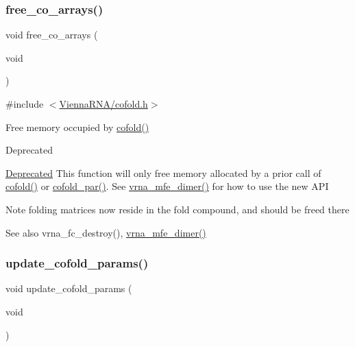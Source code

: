 \subsubsection{\texorpdfstring{free\+\_\+co\+\_\+arrays()}{free\_co\_arrays()}}
{\footnotesize\ttfamily void free\+\_\+co\+\_\+arrays (\begin{DoxyParamCaption}\item[{void}]{ }\end{DoxyParamCaption})}



{\ttfamily \#include $<$\hyperlink{cofold_8h}{Vienna\+R\+N\+A/cofold.\+h}$>$}



Free memory occupied by \hyperlink{group__mfe__cofold_gabc8517f22cfe70595ee81fc837910d52}{cofold()} 

\begin{DoxyRefDesc}{Deprecated}
\item[\hyperlink{deprecated__deprecated000032}{Deprecated}]This function will only free memory allocated by a prior call of \hyperlink{group__mfe__cofold_gabc8517f22cfe70595ee81fc837910d52}{cofold()} or \hyperlink{group__mfe__cofold_ga7612cfeeb1b793f1e4179b1eb53df1f3}{cofold\+\_\+par()}. See \hyperlink{group__mfe__cofold_gaab22d10c1190f205f16a77cab9d5d3ee}{vrna\+\_\+mfe\+\_\+dimer()} for how to use the new A\+PI\end{DoxyRefDesc}


\begin{DoxyNote}{Note}
folding matrices now reside in the fold compound, and should be free\textquotesingle{}d there 
\end{DoxyNote}
\begin{DoxySeeAlso}{See also}
vrna\+\_\+fc\+\_\+destroy(), \hyperlink{group__mfe__cofold_gaab22d10c1190f205f16a77cab9d5d3ee}{vrna\+\_\+mfe\+\_\+dimer()} 
\end{DoxySeeAlso}
\mbox{\label{group__mfe__cofold_ga4fcbf34e77b99bfbb2333d2ab0c41a57}} 
\subsubsection{\texorpdfstring{update\+\_\+cofold\+\_\+params()}{update\_cofold\_params()}}
{\footnotesize\ttfamily void update\+\_\+cofold\+\_\+params (\begin{DoxyParamCaption}\item[{void}]{ }\end{DoxyParamCaption})}



